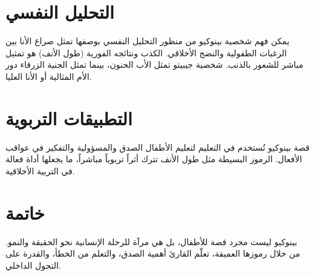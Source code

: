 \documentclass[12pt]{article}
\begin{document}
\section{التحليل النفسي}

\begin{flushright} يمكن فهم شخصية بينوكيو من منظور التحليل النفسي بوصفها تمثل صراع الأنا بين الرغبات الطفولية والنضج الأخلاقي. الكذب ونتائجه الفورية (طول الأنف) هو تمثيل مباشر للشعور بالذنب. شخصية جيبيتو تمثل الأب الحنون، بينما تمثل الجنية الزرقاء دور الأم المثالية أو الأنا العليا. \end{flushright}

\section{التطبيقات التربوية}

\begin{flushright} قصة بينوكيو تُستخدم في التعليم لتعليم الأطفال الصدق والمسؤولية والتفكير في عواقب الأفعال. الرموز البسيطة مثل طول الأنف تترك أثراً تربوياً مباشراً، ما يجعلها أداة فعالة في التربية الأخلاقية. \end{flushright}

\section{خاتمة}

\begin{flushright} بينوكيو ليست مجرد قصة للأطفال، بل هي مرآة للرحلة الإنسانية نحو الحقيقة والنمو. من خلال رموزها العميقة، تعلّم القارئ أهمية الصدق، والتعلم من الخطأ، والقدرة على التحول الداخلي. \end{flushright}
\end{document}
